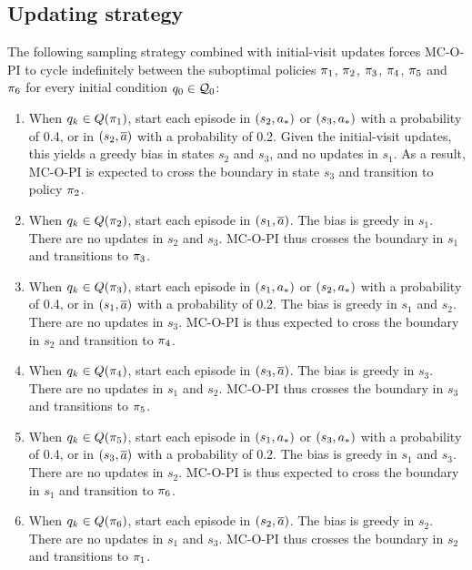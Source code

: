 



\subsection{Updating strategy}
\label{sec: 3 state sampling strat}

The following sampling strategy combined with initial-visit updates forces MC-O-PI to cycle indefinitely between the suboptimal policies $\pi_1$, $\pi_2$, $\pi_3$, $\pi_4$, $\pi_5$ and $\pi_6$ for every initial condition $q_0 \in \mathcal{Q}_0$:
\begin{enumerate}
    \item  \label{pg: sampling strat 3 states}
    When $q_{k} \in Q(\pi_1)$, start each episode in $(s_2, {a}_*)$ or $(s_3, {a}_*)$ with a probability of 0.4, or in $(s_2, \overline{a})$ with a probability of 0.2.
    Given the initial-visit updates, this yields a greedy bias in states $s_2$ and $s_3$, and no updates in $s_1$.
    As a result, MC-O-PI is expected to cross the boundary in state $s_3$ and transition to policy $\pi_2$.

    \item
    When $q_{k} \in Q(\pi_2)$, start each episode in $(s_1, \overline{a})$. 
    The bias is greedy in $s_1$. There are no updates in $s_2$ and $s_3$.
    MC-O-PI thus crosses the boundary in $s_1$ and transitions to $\pi_3$.

    \item
    When $q_{k} \in Q(\pi_3)$, start each episode in $(s_1, {a}_*)$ or $(s_2, {a}_*)$ with a probability of 0.4, or in $(s_1, \overline{a})$ with a probability of 0.2.
    The bias is greedy in $s_1$ and $s_2$. There are no updates in $s_3$.
    MC-O-PI is thus expected to cross the boundary in $s_2$ and transition to $\pi_4$.

    \item
    When $q_{k} \in Q(\pi_4)$, start each episode in $(s_3, \overline{a})$. 
    The bias is greedy in $s_3$. There are no updates in $s_1$ and $s_2$.
    MC-O-PI thus crosses the boundary in $s_3$ and transitions to $\pi_5$.

    \item
    When $q_{k} \in Q(\pi_5)$, start each episode in $(s_1, {a}_*)$ or $(s_3, {a}_*)$ with a probability of 0.4, or in $(s_3, \overline{a})$ with a probability of 0.2.
    The bias is greedy in $s_1$ and $s_3$. There are no updates in $s_2$.
    MC-O-PI is thus expected to cross the boundary in $s_1$ and transition to $\pi_6$.

    \item
    When $q_{k} \in Q(\pi_6)$, start each episode in $(s_2, \overline{a})$. 
    The bias is greedy in $s_2$. There are no updates in $s_1$ and $s_3$.
    MC-O-PI thus crosses the boundary in $s_2$ and transitions to $\pi_1$.
\end{enumerate}
\label{enum: sampling greedy initial visit}


